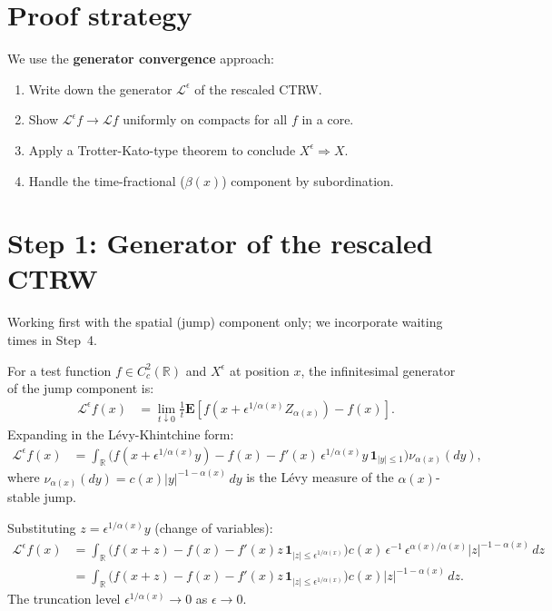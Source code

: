 \documentclass{amsart}
\theoremstyle{definition}
\begin{document}
\section{Proof strategy}

We use the \textbf{generator convergence} approach:
\begin{enumerate}
    \item Write down the generator $\mathcal{L}^\epsilon$ of the rescaled CTRW.
    \item Show $\mathcal{L}^\epsilon f \to \mathcal{L} f$ uniformly on compacts
          for all $f$ in a core.
    \item Apply a Trotter-Kato-type theorem to conclude $X^\epsilon \Rightarrow X$.
    \item Handle the time-fractional ($\beta(x)$) component by subordination.
\end{enumerate}

\section{Step 1: Generator of the rescaled CTRW}

Working first with the spatial (jump) component only; we incorporate waiting
times in Step~4.

For a test function $f \in C^2_c(\mathbb{R})$ and $X^\epsilon$ at position $x$,
the infinitesimal generator of the jump component is:
\begin{align}
    \mathcal{L}^\epsilon f(x)
    &= \lim_{t \downarrow 0} \frac{1}{t}
       \mathbf{E}\!\left[f\!\left(x + \epsilon^{1/\alpha(x)} Z_{\alpha(x)}\right) - f(x)\right].
\end{align}
Expanding in the L\'evy-Khintchine form:
\begin{align}
    \mathcal{L}^\epsilon f(x)
    &= \int_{\mathbb{R}} \bigl(f(x + \epsilon^{1/\alpha(x)} y) - f(x)
       - f'(x)\,\epsilon^{1/\alpha(x)} y\,\mathbf{1}_{|y|\leq 1}\bigr)
       \nu_{\alpha(x)}(dy),
\end{align}
where $\nu_{\alpha(x)}(dy) = c(x)|y|^{-1-\alpha(x)}\,dy$ is the L\'evy measure
of the $\alpha(x)$-stable jump.

Substituting $z = \epsilon^{1/\alpha(x)} y$ (change of variables):
\begin{align}
    \mathcal{L}^\epsilon f(x)
    &= \int_{\mathbb{R}} \bigl(f(x+z) - f(x) - f'(x)z\,\mathbf{1}_{|z|\leq\epsilon^{1/\alpha(x)}}\bigr)
       c(x)\,\epsilon^{-1}\,\epsilon^{\alpha(x)/\alpha(x)}|z|^{-1-\alpha(x)}\,dz
    \nonumber\\
    &= \int_{\mathbb{R}} \bigl(f(x+z) - f(x) - f'(x)z\,\mathbf{1}_{|z|\leq\epsilon^{1/\alpha(x)}}\bigr)
       c(x)|z|^{-1-\alpha(x)}\,dz.
    \label{eq:generator-eps}
\end{align}
The truncation level $\epsilon^{1/\alpha(x)} \to 0$ as $\epsilon \to 0$.
\end{document}
